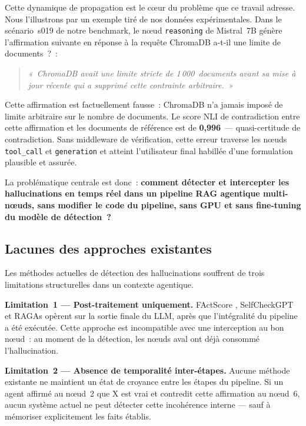 \documentclass[12pt,a4paper]{article}
\begin{document}
Cette dynamique de propagation est le cœur du problème que ce travail adresse. Nous l'illustrons par un exemple tiré de nos données expérimentales. Dans le scénario~s019 de notre benchmark, le nœud \texttt{reasoning} de Mistral~7B génère l'affirmation suivante en réponse à la requête \og{}ChromaDB a-t-il une limite de documents~?\fg{}~:

\begin{quote}
\textit{«~ChromaDB avait une limite stricte de 1\,000~documents avant sa mise à jour récente qui a supprimé cette contrainte arbitraire.~»}
\end{quote}

Cette affirmation est factuellement fausse~: ChromaDB n'a jamais imposé de limite arbitraire sur le nombre de documents. Le score NLI de contradiction entre cette affirmation et les documents de référence est de \textbf{0,996}~--- quasi-certitude de contradiction. Sans middleware de vérification, cette erreur traverse les nœuds \texttt{tool\_call} et \texttt{generation} et atteint l'utilisateur final habillée d'une formulation plausible et assurée.

La problématique centrale est donc~: \textbf{comment détecter et intercepter les hallucinations en temps réel dans un pipeline RAG agentique multi-nœuds, sans modifier le code du pipeline, sans GPU et sans fine-tuning du modèle de détection~?}

\subsection{Lacunes des approches existantes}

Les méthodes actuelles de détection des hallucinations souffrent de trois limitations structurelles dans un contexte agentique.

\textbf{Limitation~1 --- Post-traitement uniquement.} FActScore \cite{min2023factscore}, SelfCheckGPT \cite{manakul2023selfcheckgpt} et RAGAs \cite{es2023ragas} opèrent sur la sortie finale du LLM, après que l'intégralité du pipeline a été exécutée. Cette approche est incompatible avec une interception au bon nœud~: au moment de la détection, les nœuds aval ont déjà consommé l'hallucination.

\textbf{Limitation~2 --- Absence de temporalité inter-étapes.} Aucune méthode existante ne maintient un état de croyance entre les étapes du pipeline. Si un agent affirmé au nœud~2 que \og{}X est vrai\fg{} et contredit cette affirmation au nœud~6, aucun système actuel ne peut détecter cette incohérence interne --- sauf à mémoriser explicitement les faits établis.
\end{document}
